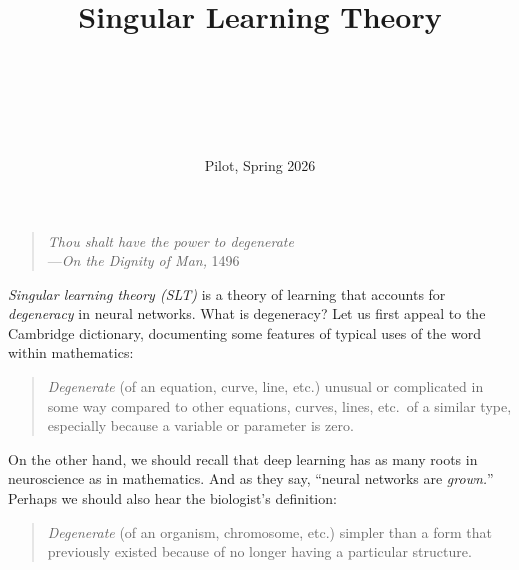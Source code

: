 \documentclass[11pt]{article}
\title{
    Singular Learning Theory
}
\author{
    \authorname{Kai Ogden}\\
    \affiliation{University of Oxford}
    \and
    \authorname{Matthew Farrugia-Roberts}\\
    \affiliation{University of Oxford}
    \and
    \authorname{Zach Furman}\\
    \affiliation{The University of Melbourne}
}
\date{%
    Pilot, Spring 2026
}
\begin{document}

\maketitle

\thispagestyle{copyright}

\bgroup
\renewcommand\section[2]{}
\setlength{\parskip}{0ex}
\tableofcontents
\egroup




\clearpage
\thispagestyle{empty}
\null
\vfill
\begin{quote}
    \centering
    \textit{Thou shalt have the power to degenerate}\\
    \qquad\qquad\qquad---\textit{On the Dignity of Man,} 1496
\end{quote}
\vfill
\vfill


\clearpage

\section*{Introduction}
\label{sec:intro}

\emph{Singular learning theory (SLT)} is a theory of learning that accounts for
\emph{degeneracy} in neural networks. What is degeneracy? Let us first appeal
to the Cambridge dictionary, documenting some features of typical uses of the
word within mathematics:
\begin{quote}
    \emph{Degenerate} (of an equation, curve, line, etc.) unusual or
    complicated in some way compared to other equations, curves, lines, etc.\
    of a similar type, especially because a variable or parameter is zero.
\end{quote}
On the other hand, we should recall that deep learning has as many roots in
neuroscience as in mathematics. And as they say, ``neural networks are
\emph{grown.}'' Perhaps we should also hear the biologist's definition:
\begin{quote}
    \emph{Degenerate} (of an organism, chromosome, etc.) simpler than a form
    that previously existed because of no longer having a particular structure.
\end{quote}
\end{document}
